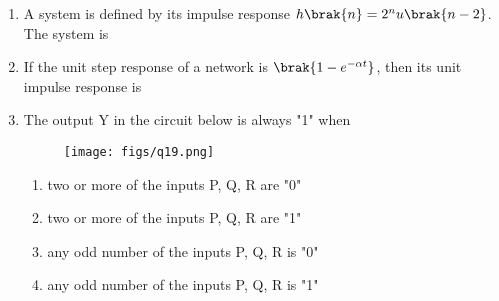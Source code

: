 \documentclass[a4paper, 11pt]{article}
\begin{document}
\begin{enumerate}
    \hfill{}
    \item A system is defined by its impulse response $h\brak{n}=2^{n}u\brak{n-2}$. The system is
    
    \begin{enumerate}
    \end{enumerate}

    \hfill{}

    \item If the unit step response of a network is $\brak{1-e^{-\alpha t}}$, then its unit impulse response is
    
    \begin{enumerate}
    \end{enumerate}

    \hfill{}

    \item The output Y in the circuit below is always "1" when
    
    \begin{figure}[H]
        \centering
        \texttt{[image: figs/q19.png]}
        \caption*{}
        \label{fig:q19}
    \end{figure}
    
    \begin{enumerate}
        \item two or more of the inputs P, Q, R are "0"
        \item two or more of the inputs P, Q, R are "1"
        \item any odd number of the inputs P, Q, R is "0"
        \item any odd number of the inputs P, Q, R is "1"
    \end{enumerate}


\end{enumerate}
\end{document}
